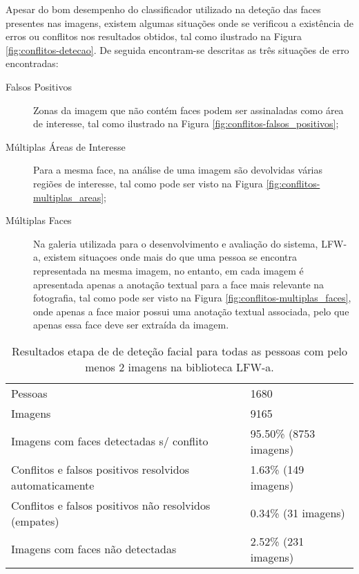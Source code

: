 Apesar do bom desempenho do classificador utilizado na deteção das faces presentes nas imagens, existem algumas situações onde se verificou a existência de erros ou conflitos nos resultados obtidos, tal como ilustrado na Figura  \ref{fig:conflitos-detecao}. De seguida encontram-se descritas as três situações de erro encontradas:
\begin{description}
\item[Falsos Positivos] Zonas da imagem que não contém faces podem ser assinaladas como área de interesse, tal como ilustrado na Figura \ref{fig:conflitos-falsos_positivos};
\item[Múltiplas Áreas de Interesse] Para a mesma face, na análise de uma imagem são devolvidas várias regiões de interesse, tal como pode ser visto na Figura \ref{fig:conflitos-multiplas_areas};
\item[Múltiplas Faces] Na galeria utilizada para o desenvolvimento e avaliação do sistema, LFW-a, existem situaçoes onde mais do que uma pessoa se encontra representada na mesma imagem, no entanto, em cada imagem é apresentada apenas a anotação textual para a face mais relevante na fotografia, tal como pode ser visto na Figura \ref{fig:conflitos-multiplas_faces}, onde apenas a face maior possui uma anotação textual associada, pelo que apenas essa face deve ser extraída da imagem.
\end{description}

\begin{table}
\caption{Resultados etapa de de deteção facial para todas as pessoas com pelo menos 2 imagens na biblioteca LFW-a.}
    \begin{tabular}{ll}
    \hline
    \hline
    Pessoas                                                 & 1680                   \\
    Imagens                                                 & 9165                   \\ \hline
    Imagens com faces detectadas s/ conflito                & 95.50\% (8753 imagens) \\
    Conflitos e falsos positivos resolvidos automaticamente & 1.63\% (149 imagens)   \\
    Conflitos e falsos positivos não resolvidos (empates)   & 0.34\% (31 imagens)    \\
    Imagens com faces não detectadas                        & 2.52\% (231 imagens)   \\
    \hline
    \hline
    \end{tabular}
    \label{tab:desempenho_detecao}
\end{table}

